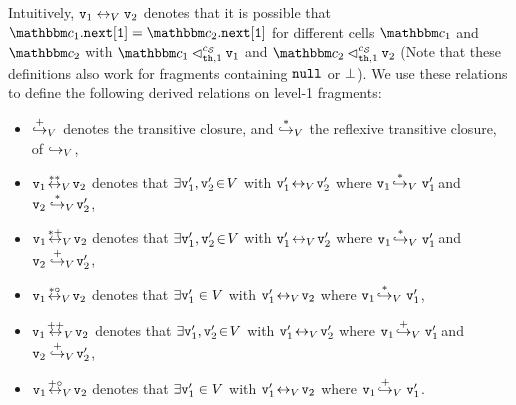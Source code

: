 Intuitively, $\mathtt{v}_1 \leftrightarrow_{V} \mathtt{v}_2$ denotes that it is
possible that
  $\cell_1.{\tt next[1]} = \cell_2.{\tt next[1]}$
for different cells  $\cell_1$ and $\cell_2$ with
  $\cell_1 \lsatfrag{1}{{\thread}}{\sconf} \frag_1$ and
  $\cell_2 \lsatfrag{1}{{\thread}}{\sconf} \frag_2$
(Note that these definitions also work for fragments containing
${\tt null}$ or $\bot$).
We use these relations to define the following derived relations on level-1 fragments:
\begin{itemize}
\item $\overset{+}\hookrightarrow_{V}$ denotes the transitive closure,
  and
   $\overset{*}\hookrightarrow_{V}$ the reflexive transitive closure, of
  $\hookrightarrow_{V}$,
\item $\mathtt{v}_1 \!  \overset{**}\leftrightarrow_{V}  \! \mathtt{v}_2$ denotes that 
  $\exists \mathtt{v}_1',\mathtt{v}_2' \!\in\! V$ with $\mathtt{v}_1' \! \leftrightarrow_{V} \! \mathtt{v}_2'$ where
  $\mathtt{v}_1 \!  \overset{*}\hookrightarrow_{V} \mathtt{v}_1' \!$ and $\mathtt{v}_2  \overset{*}\hookrightarrow_{V} \! \mathtt{v}_2'$,
\item $\mathtt{v}_1 \!  \overset{*+}\leftrightarrow_{V}  \! \mathtt{v}_2$ denotes that
  $\exists \mathtt{v}_1', \mathtt{v}_2' \!\in\! V$ with $\mathtt{v}_1' \! \leftrightarrow_{V} \! \mathtt{v}_2'$ where
  $\mathtt{v}_1 \!  \overset{*}\hookrightarrow_{V} \mathtt{v}_1' \!$ and $\mathtt{v}_2  \overset{+}\hookrightarrow_{V} \! \mathtt{v}_2'$,
\item $\mathtt{v}_1 \!  \overset{*\circ}\leftrightarrow_{V}  \! \mathtt{v}_2$ denotes that $\exists \mathtt{v}_1' \in V$ with $\mathtt{v}_1' \! \leftrightarrow_{V} \! \mathtt{v}_2$ where
  $\mathtt{v}_1 \!  \overset{*}\hookrightarrow_{V} \mathtt{v}_1'$,
\item $\mathtt{v}_1 \!  \overset{++}\leftrightarrow_{V}  \! \mathtt{v}_2$ denotes that
  $\exists \mathtt{v}_1',\mathtt{v}_2' \!\in\! V$ with $\mathtt{v}_1' \! \leftrightarrow_{V} \! \mathtt{v}_2'$ where
  $\mathtt{v}_1 \!  \overset{+}\hookrightarrow_{V} \mathtt{v}_1' \!$ and $\mathtt{v}_2  \overset{+}\hookrightarrow_{V} \! \mathtt{v}_2'$,
\item $\mathtt{v}_1 \!  \overset{+\circ}\leftrightarrow_{V}  \! \mathtt{v}_2$ denotes that
  $\exists \mathtt{v}_1' \in V$ with $\mathtt{v}_1' \! \leftrightarrow_{V} \! \mathtt{v}_2$ where
  $\mathtt{v}_1 \!  \overset{+}\hookrightarrow_{V} \mathtt{v}_1'$.
\end{itemize}
